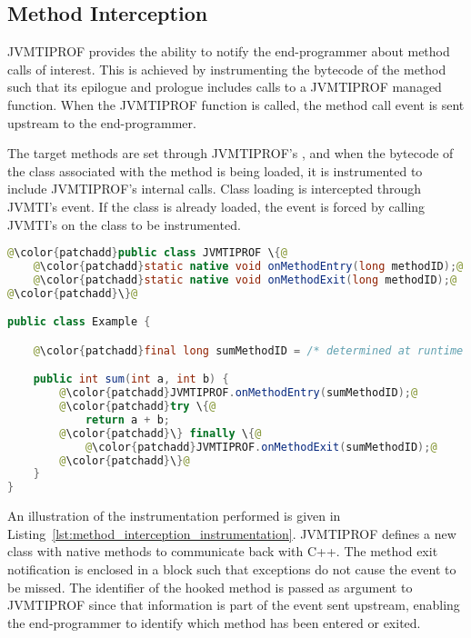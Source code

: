 \subsection{Method Interception}

JVMTIPROF provides the ability to notify the end-programmer about method calls of interest. This is achieved by instrumenting the bytecode of the method such that its epilogue and prologue includes calls to a JVMTIPROF managed function. When the JVMTIPROF function is called, the method call event is sent upstream to the end-programmer.

The target methods are set through JVMTIPROF's , and when the bytecode of the class associated with the method is being loaded, it is instrumented to include JVMTIPROF's internal calls. Class loading is intercepted through JVMTI's   event. If the class is already loaded, the event is forced by calling JVMTI's  on the class to be instrumented.

\begin{lstlisting}[language=Java, escapechar=@, caption=Example instrumentation applied by method interception. Instrumented code is in green. The \code{sum} method is modified such that JVMTIPROF is notified about entries and exits on it.,label=lst:method_interception_instrumentation]
@\color{patchadd}public class JVMTIPROF \{@
    @\color{patchadd}static native void onMethodEntry(long methodID);@
    @\color{patchadd}static native void onMethodExit(long methodID);@
@\color{patchadd}\}@

public class Example {

    @\color{patchadd}final long sumMethodID = /* determined at runtime */;@

    public int sum(int a, int b) {
        @\color{patchadd}JVMTIPROF.onMethodEntry(sumMethodID);@
        @\color{patchadd}try \{@
            return a + b;
        @\color{patchadd}\} finally \{@
            @\color{patchadd}JVMTIPROF.onMethodExit(sumMethodID);@
        @\color{patchadd}\}@
    }
}
\end{lstlisting}

An illustration of the instrumentation performed is given in Listing~\ref{lst:method_interception_instrumentation}. JVMTIPROF defines a new class with native methods to communicate back with C++. The method exit notification is enclosed in a  block such that exceptions do not cause the event to be missed. The identifier of the hooked method is passed as argument to JVMTIPROF since that information is part of the event sent upstream, enabling the end-programmer to identify which method has been entered or exited.



